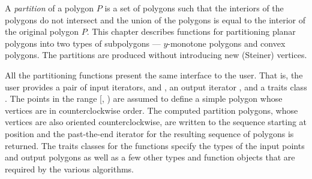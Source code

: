 A {\em partition} of a polygon $P$ is a set of 
polygons %
such that the 
interiors of the polygons do not intersect and the union of the polygons 
is equal to the interior of the original polygon $P$.  
This chapter describes functions for partitioning
planar polygons into two types of subpolygons --- $y$-monotone polygons and
convex polygons.  The partitions are produced without introducing new
(Steiner) vertices. 

All the partitioning functions present the same interface to
the user.  That is, the user provides a pair of input iterators, 
and , an output iterator ,  and a traits class 
. The points in the range [, ) are assumed
to define a simple polygon whose vertices are in counterclockwise order.
The computed partition polygons, whose vertices are also oriented 
counterclockwise, are written to the sequence starting at position
 and the past-the-end iterator for the resulting sequence of
polygons is returned.  The traits classes for the functions specify the types
of the input points and output polygons as well as a few other types and
function objects that are required by the various algorithms.
